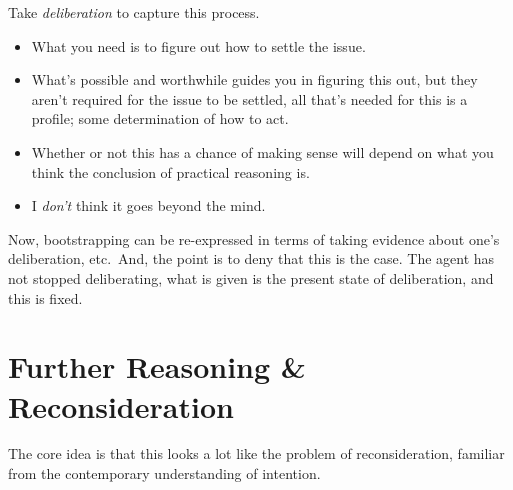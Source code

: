 \documentclass[10pt]{article}
\begin{document}
Take \emph{deliberation} to capture this process.
\begin{itemize}
\item What you need is to figure out how to settle the issue.
\item What's possible and worthwhile guides you in figuring this out, but they aren't required for the issue to be settled, all that's needed for this is a profile; some determination of how to act.
\end{itemize}

\begin{itemize}
\item Whether or not this has a chance of making sense will depend on what you think the conclusion of practical reasoning is.
\item I \emph{don't} think it goes beyond the mind.
\end{itemize}


Now, bootstrapping can be re-expressed in terms of taking evidence about one's deliberation, etc.\
And, the point is to deny that this is the case.
The agent has not stopped deliberating, what is given is the present state of deliberation, and this is fixed.

\newpage

\section{Further Reasoning \& Reconsideration}
\label{sec:further-reasoning-}

The core idea is that this looks a lot like the problem of reconsideration, familiar from the contemporary understanding of intention.
\end{document}
